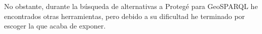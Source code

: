 
No obstante, durante la búsqueda de alternativas a Protegé para GeoSPARQL he encontrados otras herramientas, pero debido a su dificultad he terminado por escoger la que acaba de exponer.

